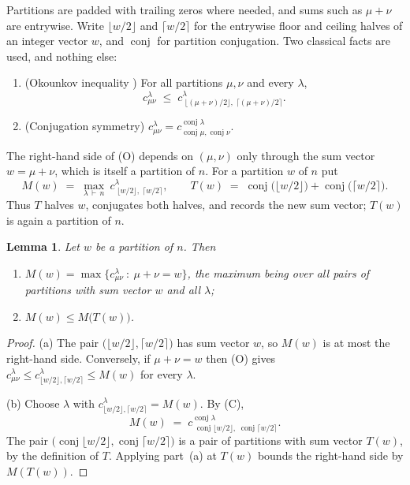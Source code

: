 \documentclass[11pt]{article}
\newtheorem{lemma}[theorem]{Lemma}
\theoremstyle{remark}
\newcommand{\lam}{\lambda}
\DeclareMathOperator{\conj}{conj}
\begin{document}
Partitions are padded with trailing zeros where needed, and sums such as $\mu+\nu$ are
entrywise. Write $\lfloor w/2\rfloor$ and $\lceil w/2\rceil$ for the entrywise floor and ceiling
halves of an integer vector $w$, and $\conj$ for partition conjugation. Two classical
facts are used, and nothing else:
\begin{enumerate}
\item[(O)] (Okounkov inequality \cite{Oko97,LPP07}) For all partitions $\mu,\nu$ and
every $\lam$,
\[
c^{\lam}_{\mu\nu}\;\le\;c^{\lam}_{\;\lfloor(\mu+\nu)/2\rfloor,\;\lceil(\mu+\nu)/2\rceil}.
\]
\item[(C)] (Conjugation symmetry) $c^{\lam}_{\mu\nu}=c^{\conj\lam}_{\conj\mu,\conj\nu}$.
\end{enumerate}
The right-hand side of (O) depends on $(\mu,\nu)$ only through the sum vector
$w=\mu+\nu$, which is itself a partition of $n$. For a partition $w$ of $n$ put
\[
M(w)\;=\;\max_{\lam\,\vdash\,n}\ c^{\lam}_{\;\lfloor w/2\rfloor,\;\lceil w/2\rceil},
\qquad
T(w)\;=\;\conj\bigl(\lfloor w/2\rfloor\bigr)+\conj\bigl(\lceil w/2\rceil\bigr) .
\]
Thus $T$ halves $w$, conjugates both halves, and records the new sum vector; $T(w)$ is
again a partition of $n$.

\begin{lemma}\label{lem:mono}
Let $w$ be a partition of $n$. Then
\begin{enumerate}
\item[(a)] $M(w)=\max\bigl\{c^{\lam}_{\mu\nu}\ :\ \mu+\nu=w\bigr\}$, the maximum being
over all pairs of partitions with sum vector $w$ and all $\lam$;
\item[(b)] $M(w)\le M\bigl(T(w)\bigr)$.
\end{enumerate}
\end{lemma}

\begin{proof}
(a) The pair $\bigl(\lfloor w/2\rfloor,\lceil w/2\rceil\bigr)$ has sum vector $w$, so
$M(w)$ is at most the right-hand side. Conversely, if $\mu+\nu=w$ then (O) gives
$c^{\lam}_{\mu\nu}\le c^{\lam}_{\lfloor w/2\rfloor,\lceil w/2\rceil}\le M(w)$ for every
$\lam$.

(b) Choose $\lam$ with $c^{\lam}_{\lfloor w/2\rfloor,\lceil w/2\rceil}=M(w)$. By (C),
\[
M(w)\;=\;c^{\conj\lam}_{\;\conj\lfloor w/2\rfloor,\;\conj\lceil w/2\rceil}.
\]
The pair $\bigl(\conj\lfloor w/2\rfloor,\conj\lceil w/2\rceil\bigr)$ is a pair of
partitions with sum vector $T(w)$, by the definition of $T$. Applying part~(a) at
$T(w)$ bounds the right-hand side by $M(T(w))$.
\end{proof}
\end{document}
